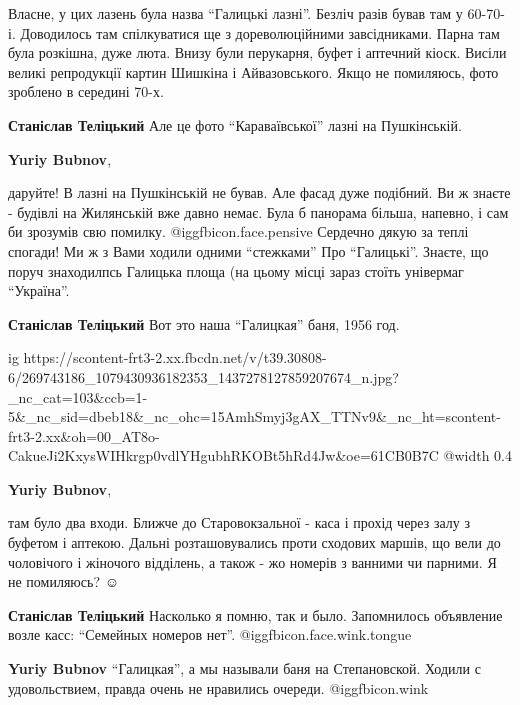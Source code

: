  
 
 
 
 



Власне, у цих лазень була назва \enquote{Галицькі лазні}. Безліч разів бував там у
60-70-і. Доводилось там спілкуватися ще з дореволюційними завсідниками. Парна
там була розкішна, дуже люта. Внизу були перукарня, буфет і аптечний кіоск.
Висіли великі репродукції картин Шишкіна і Айвазовського. Якщо не помиляюсь,
фото зроблено в середині 70-х.

\textbf{Станіслав Теліцький} Але це фото \enquote{Караваївської} лазні на Пушкінській.

\textbf{Yuriy Bubnov}, 

даруйте! В лазні на Пушкінській не бував. Але фасад дуже подібний. Ви ж знаєте
- будівлі на Жилянській вже давно немає. Була б панорама більша, напевно, і сам
би зрозумів свю помилку.  @igg{fbicon.face.pensive}  Сердечно дякую за теплі спогади! Ми ж з Вами ходили
одними \enquote{стежками} Про \enquote{Галицькі}. Знаєте, що поруч знаходилпсь Галицька площа
(на цьому місці зараз стоїть універмаг \enquote{Україна}.

\textbf{Станіслав Теліцький} Вот это наша \enquote{Галицкая} баня, 1956 год.

\ifcmt
  ig https://scontent-frt3-2.xx.fbcdn.net/v/t39.30808-6/269743186_1079430936182353_1437278127859207674_n.jpg?_nc_cat=103&ccb=1-5&_nc_sid=dbeb18&_nc_ohc=15AmhSmyj3gAX_TTNv9&_nc_ht=scontent-frt3-2.xx&oh=00_AT8o-CakueJi2KxysWIHkrgp0vdlYHgubhRKOBt5hRd4Jw&oe=61CB0B7C
  @width 0.4
\fi

\textbf{Yuriy Bubnov}, 

там було два входи. Ближче до Старовокзальної - каса і прохід через залу з
буфетом і аптекою. Дальні розташовувались проти сходових маршів, що вели до
чоловічого і жіночого відділень, а також - жо номерів з ванними чи парними. Я
не помиляюсь?  ☺ ️ 

\textbf{Станіслав Теліцький} Насколько я помню, так и было. Запомнилось объявление возле касс: \enquote{Семейных номеров нет}. @igg{fbicon.face.wink.tongue} 

\textbf{Yuriy Bubnov} \enquote{Галицкая}, а мы называли баня на Степановской. Ходили с удовольствием, правда очень не нравились очереди. @igg{fbicon.wink} 
